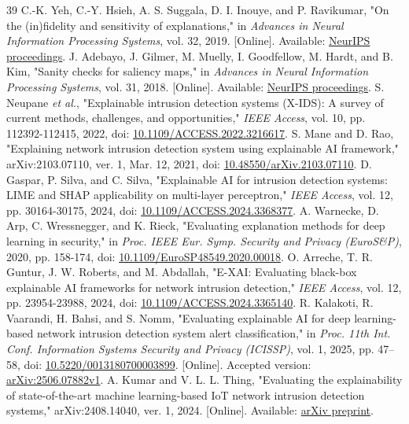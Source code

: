 \documentclass[journal,letterpaper]{IEEEtran}
\begin{document}
\begin{thebibliography}{39}
 C.-K. Yeh, C.-Y. Hsieh, A. S. Suggala, D. I. Inouye, and P. Ravikumar, "On the (in)fidelity and sensitivity of explanations," in \emph{Advances in Neural Information Processing Systems}, vol. 32, 2019. [Online]. Available: \href{https://proceedings.neurips.cc/paper/2019/hash/a7471fdc77b3435276507cc8f2dc2569-Abstract.html}{NeurIPS proceedings}.
 J. Adebayo, J. Gilmer, M. Muelly, I. Goodfellow, M. Hardt, and B. Kim, "Sanity checks for saliency maps," in \emph{Advances in Neural Information Processing Systems}, vol. 31, 2018. [Online]. Available: \href{https://proceedings.neurips.cc/paper/2018/hash/294a8ed24b1ad22ec2e7efea049b8737-Abstract.html}{NeurIPS proceedings}.
 S. Neupane \emph{et al.}, "Explainable intrusion detection systems (X-IDS): A survey of current methods, challenges, and opportunities," \emph{IEEE Access}, vol. 10, pp. 112392-112415, 2022, doi: \href{https://doi.org/10.1109/ACCESS.2022.3216617}{10.1109/ACCESS.2022.3216617}.
 S. Mane and D. Rao, "Explaining network intrusion detection system using explainable AI framework," arXiv:2103.07110, ver. 1, Mar. 12, 2021, doi: \href{https://doi.org/10.48550/arXiv.2103.07110}{10.48550/arXiv.2103.07110}.
 D. Gaspar, P. Silva, and C. Silva, "Explainable AI for intrusion detection systems: LIME and SHAP applicability on multi-layer perceptron," \emph{IEEE Access}, vol. 12, pp. 30164-30175, 2024, doi: \href{https://doi.org/10.1109/ACCESS.2024.3368377}{10.1109/ACCESS.2024.3368377}.
 A. Warnecke, D. Arp, C. Wressnegger, and K. Rieck, "Evaluating explanation methods for deep learning in security," in \emph{Proc. IEEE Eur. Symp. Security and Privacy (EuroS\&P)}, 2020, pp. 158-174, doi: \href{https://doi.org/10.1109/EuroSP48549.2020.00018}{10.1109/EuroSP48549.2020.00018}.
 O. Arreche, T. R. Guntur, J. W. Roberts, and M. Abdallah, "E-XAI: Evaluating black-box explainable AI frameworks for network intrusion detection," \emph{IEEE Access}, vol. 12, pp. 23954-23988, 2024, doi: \href{https://doi.org/10.1109/ACCESS.2024.3365140}{10.1109/ACCESS.2024.3365140}.
 R. Kalakoti, R. Vaarandi, H. Bahsi, and S. Nomm, "Evaluating explainable AI for deep learning-based network intrusion detection system alert classification," in \emph{Proc. 11th Int. Conf. Information Systems Security and Privacy (ICISSP)}, vol. 1, 2025, pp. 47--58, doi: \href{https://doi.org/10.5220/0013180700003899}{10.5220/0013180700003899}. [Online]. Accepted version: \href{https://arxiv.org/abs/2506.07882v1}{arXiv:2506.07882v1}.
 A. Kumar and V. L. L. Thing, "Evaluating the explainability of state-of-the-art machine learning-based IoT network intrusion detection systems," arXiv:2408.14040, ver. 1, 2024. [Online]. Available: \href{https://arxiv.org/abs/2408.14040v1}{arXiv preprint}.

\end{thebibliography}
\end{document}
